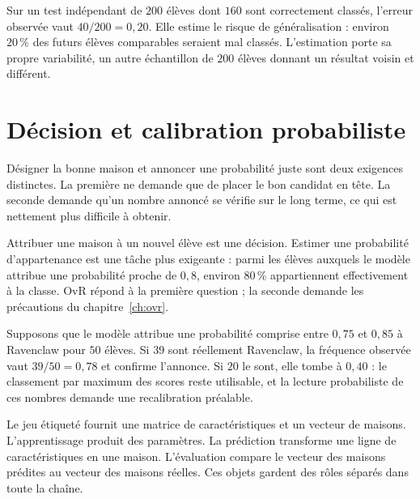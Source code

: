 Sur un test indépendant de $200$ élèves dont $160$ sont correctement classés,
l'erreur observée vaut $40/200=0{,}20$. Elle estime le risque de généralisation :
environ $20\,\%$ des futurs élèves comparables seraient mal classés. L'estimation
porte sa propre variabilité, un autre échantillon de $200$ élèves donnant un
résultat voisin et différent.

\section{Décision et calibration probabiliste}

\begin{lecture}
Désigner la bonne maison et annoncer une probabilité juste sont deux exigences
distinctes. La première ne demande que de placer le bon candidat en tête. La
seconde demande qu'un nombre annoncé se vérifie sur le long terme, ce qui est
nettement plus difficile à obtenir.
\end{lecture}

Attribuer une maison à un nouvel élève est une décision. Estimer une probabilité
d'appartenance  est une tâche plus exigeante : parmi les élèves auxquels
le modèle attribue une probabilité proche de $0{,}8$, environ $80\,\%$
appartiennent effectivement à la classe. OvR répond à la première question ; la
seconde demande les précautions du chapitre~\ref{ch:ovr}.

Supposons que le modèle attribue une probabilité comprise entre $0{,}75$ et
$0{,}85$ à Ravenclaw pour $50$ élèves. Si $39$ sont réellement Ravenclaw, la
fréquence observée vaut $39/50=0{,}78$ et confirme l'annonce. Si $20$ le sont,
elle tombe à $0{,}40$ : le classement par maximum des scores reste utilisable, et
la lecture probabiliste de ces nombres demande une recalibration préalable.

\begin{resultat}
Le jeu étiqueté fournit une matrice de caractéristiques et un vecteur de maisons.
L'apprentissage produit des paramètres. La prédiction transforme une ligne de
caractéristiques en une maison. L'évaluation compare le vecteur des maisons
prédites au vecteur des maisons réelles. Ces objets gardent des rôles séparés
dans toute la chaîne.
\end{resultat}
